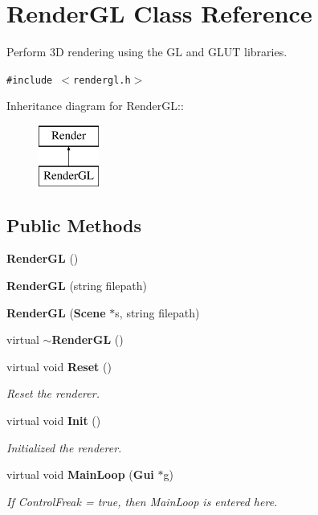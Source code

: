 \section{Render\-GL  Class Reference}
\label{class_RenderGL}
Perform 3D rendering using the GL and GLUT libraries. 


{\tt \#include $<$rendergl.h$>$}

Inheritance diagram for Render\-GL::\begin{figure}[H]
\begin{center}
\leavevmode
\includegraphics[height=2cm]{class_RenderGL}
\end{center}
\end{figure}
\subsection*{Public Methods}
\begin{CompactItemize}
\item 
{\bf Render\-GL} ()
\item 
{\bf Render\-GL} (string filepath)
\item 
{\bf Render\-GL} ({\bf Scene} $\ast$s, string filepath)
\item 
virtual {\bf $\sim$Render\-GL} ()
\item 
virtual void {\bf Reset} ()
\begin{CompactList}\small\item\em Reset the renderer.\item\end{CompactList}\item 
virtual void {\bf Init} ()
\begin{CompactList}\small\item\em Initialized the renderer.\item\end{CompactList}\item 
virtual void {\bf Main\-Loop} ({\bf Gui} $\ast$g)
\begin{CompactList}\small\item\em If Control\-Freak = true, then Main\-Loop is entered here.\item\end{CompactList}\end{CompactItemize}

